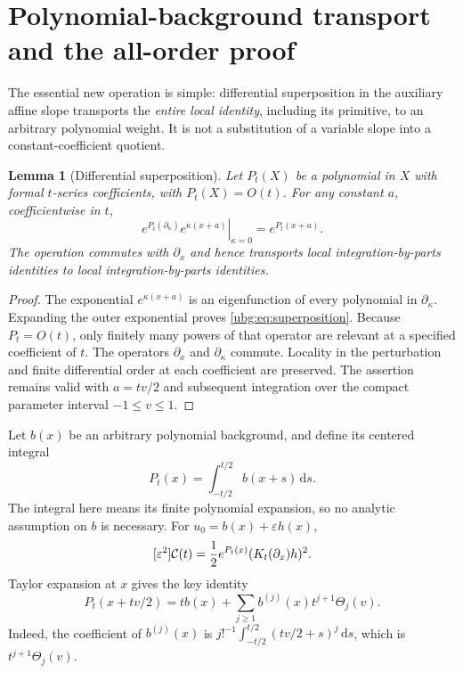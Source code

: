 \documentclass[11pt,letterpaper]{article}
\numberwithin{equation}{section}
\newtheorem{lemma}[theorem]{Lemma}
\theoremstyle{definition}\newtheorem{definition}[theorem]{Definition}
\theoremstyle{remark}\newtheorem{remark}[theorem]{Remark}
\newcommand{\dd}{\,\mathrm d}\newcommand{\ii}{\mathrm i}
\begin{document}
\section{Polynomial-background transport and the all-order proof}
\label{ubg:sec:transport}

The essential new operation is simple: differential superposition in
the auxiliary affine slope transports the \emph{entire local identity},
including its primitive, to an arbitrary polynomial weight. It is not
a substitution of a variable slope into a constant-coefficient quotient.

\begin{lemma}[Differential superposition]\label{ubg:lem:superposition}
Let $P_t(X)$ be a polynomial in $X$ with formal $t$-series coefficients,
with $P_t(X)=O(t)$. For any constant $a$, coefficientwise in $t$,
\begin{equation}\label{ubg:eq:superposition}
 \left.e^{P_t(\partial_\kappa)}e^{\kappa(x+a)}\right|_{\kappa=0}
                         =e^{P_t(x+a)}.
\end{equation}
The operation commutes with $\partial_x$ and hence transports local
integration-by-parts identities to local integration-by-parts identities.
\end{lemma}
\begin{proof}
The exponential $e^{\kappa(x+a)}$ is an eigenfunction of every polynomial
in $\partial_\kappa$. Expanding the outer exponential proves
\eqref{ubg:eq:superposition}. Because $P_t=O(t)$, only finitely many
powers of that operator are relevant at a specified coefficient of $t$.
The operators $\partial_x$ and $\partial_\kappa$ commute. Locality in
the perturbation and finite differential order at each coefficient are
preserved. The assertion remains valid with $a=tv/2$ and subsequent
integration over the compact parameter interval $-1\le v\le1$.
\end{proof}

Let $b(x)$ be an arbitrary polynomial background, and define its centered
integral
\begin{equation}\label{ubg:eq:background-P}
 P_t(x)=\int_{-t/2}^{t/2}b(x+s)\dd s.
\end{equation}
The integral here means its finite polynomial expansion, so no analytic
assumption on $b$ is necessary. For $u_0=b(x)+\varepsilon h(x)$,
\begin{equation}\label{ubg:eq:quadratic-general}
 [\varepsilon^2]\mathcal C(t)=\frac12e^{P_t(x)}(K_t(\partial_x)h)^2.
\end{equation}
Taylor expansion at $x$ gives the key identity
\begin{equation}\label{ubg:eq:shifted-background}
 P_t(x+tv/2)
 =t b(x)+\sum_{j\ge1}b^{(j)}(x)t^{j+1}\Theta_j(v).
\end{equation}
Indeed, the coefficient of $b^{(j)}(x)$ is
$j!^{-1}\int_{-t/2}^{t/2}(tv/2+s)^j\dd s$, which is
$t^{j+1}\Theta_j(v)$.
\end{document}
